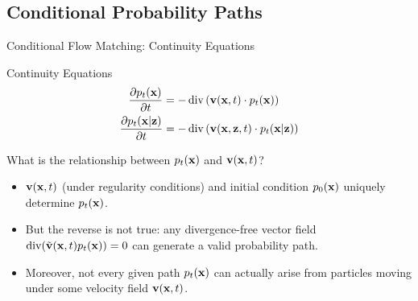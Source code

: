 \documentclass{beamer}
\begin{document}
\subsection{Conditional Probability Paths}
\begin{frame}{Conditional Flow Matching: Continuity Equations}
	\begin{block}{Continuity Equations}
		\vspace{-0.5cm}
		\begin{align*}
			\frac{\partial p_t(\mathbf{x})}{\partial t} &= - \operatorname{div}\left(\mathbf{v}(\mathbf{x}, t) \cdot p_t(\mathbf{x})\right) \\
			\frac{\partial p_t(\mathbf{x} | \mathbf{z})}{\partial t} &= - \operatorname{div}\left(\mathbf{v}(\mathbf{x}, \mathbf{z}, t) \cdot p_t(\mathbf{x} | \mathbf{z})\right)
		\end{align*}
		\vspace{-0.5cm}
	\end{block}
	What is the relationship between $p_t(\mathbf{x})$ and $\mathbf{v}(\mathbf{x}, t)$?
	\eqpause
	\begin{itemize}
		\item $\mathbf{v}(\mathbf{x}, t)$ (under regularity conditions) and initial condition $p_0(\mathbf{x})$ uniquely determine $p_t(\mathbf{x})$.
		\eqpause
		\item But the reverse is not true: any divergence-free vector field $\operatorname{div}(\tilde{\mathbf{v}}(\mathbf{x}, t)p_t(\mathbf{x})) = 0$ can generate a valid probability path.
		\eqpause
		\item Moreover, not every given path $p_t(\mathbf{x})$ can actually arise from particles moving under
		some velocity field $\mathbf{v}(\mathbf{x}, t)$.
	\end{itemize}
\end{frame}
\end{document}
